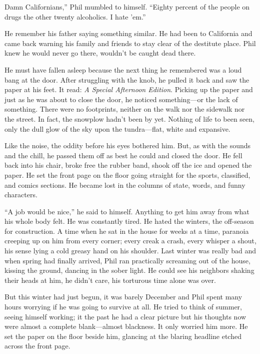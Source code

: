 Damn Californians,'' Phil mumbled to himself. ``Eighty percent of the
people on drugs the other twenty alcoholics. I hate 'em.''

He remember his father saying something similar. He had been to
California and came back warning his family and friends to stay clear of
the destitute place. Phil knew he would never go there, wouldn't be
caught dead there.

He must have fallen asleep because the next thing he remembered was a
loud bang at the door. After struggling with the knob, he pulled it back
and saw the paper at his feet. It read: \emph{A Special Afternoon
Edition}. Picking up the paper and just as he was about to close the
door, he noticed something---or the lack of something. There were no
footprints, neither on the walk nor the sidewalk nor the street. In
fact, the snowplow hadn't been by yet. Nothing of life to been seen,
only the dull glow of the sky upon the tundra---flat, white and
expansive.

Like the noise, the oddity before his eyes bothered him. But, as with
the sounds and the chill, he passed them off as best he could and closed
the door. He fell back into his chair, broke free the rubber band, shook
off the ice and opened the paper. He set the front page on the floor
going straight for the sports, classified, and comics sections. He
became lost in the columns of state, words, and funny characters.

``A job would be nice,'' he said to himself. Anything to get him away
from what his whole body felt. He was constantly tired. He hated the
winters, the off-season for construction. A time when he sat in the
house for weeks at a time, paranoia creeping up on him from every
corner; every creak a crash, every whisper a shout, his sense lying a
cold greasy hand on his shoulder. Last winter was really bad and when
spring had finally arrived, Phil ran practically screaming out of the
house, kissing the ground, dancing in the sober light. He could see his
neighbors shaking their heads at him, he didn't care, his torturous time
alone was over.

But this winter had just begun, it was barely December and Phil spent
many hours worrying if he was going to survive at all. He tried to think
of summer, seeing himself working; it the past he had a clear picture
but his thoughts now were almost a complete blank---almost blackness. It
only worried him more. He set the paper on the floor beside him,
glancing at the blaring headline etched across the front page.

